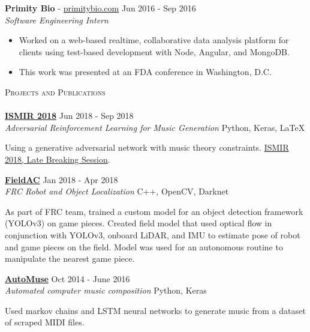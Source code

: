 \documentclass[a4paper]{article}
\newcommand{\lineunder} {
	\vspace*{-8pt} \\
	\hspace*{-18pt} \hrulefill \\
}
\newcommand{\header} [1] {
	{\hspace*{-18pt}\vspace*{6pt} \textsc{#1}}
	\vspace*{-6pt} \lineunder
}
\begin{document}
\noindent
\textbf{Primity Bio} - \url{primitybio.com} \hfill Jun 2016 - Sep 2016\\
\textit{Software Engineering Intern} \\
\vspace{-6mm}
\begin{itemize} \itemsep 0.1pt
	\item Worked on a web-based realtime, collaborative data analysis platform for clients using test-based development with Node, Angular, and MongoDB.
	\item This work was presented at an FDA conference in Washington, D.C.
\end{itemize}



\header{Projects and Publications}
\noindent
\href{http://ismir2018.ircam.fr/pages/events-lbd.html}{\textbf{ISMIR 2018}} \hfill Jun 2018 - Sep 2018\\
\textit{Adversarial Reinforcement Learning for Music Generation} \hfill Python, Keras, \LaTeX\\
\vspace{-25pt}
\begin{paragraph}{}
\begin{sloppypar}
Using a generative adversarial network with music theory constraints. \href{http://ismir2018.ircam.fr/pages/events-lbd.html}{ISMIR 2018, Late Breaking Session}.\\
\end{sloppypar}
\end{paragraph}

\noindent
\href{https://github.com/RoboticsTeam4904/FieldAC}{\textbf{FieldAC}} \hfill Jan 2018 - Apr 2018\\
\textit{FRC Robot and Object Localization} \hfill C++, OpenCV, Darknet\\
\vspace{-25pt}
\begin{paragraph}{}
As part of FRC team, trained a custom model for an object detection framework (YOLOv3) on game pieces. Created field model that used optical flow in conjunction with YOLOv3, onboard LiDAR, and IMU to estimate pose of robot and game pieces on the field. Model was used for an autonomous routine to manipulate the nearest game piece.\\

\end{paragraph}
\noindent
\href{https://github.com/nacgarg/AutoMuse}{\textbf{AutoMuse}} \hfill Oct 2014 - June 2016\\
\textit{Automated computer music composition} \hfill Python, Keras
\vspace{-13pt}
\begin{paragraph}{}
Used markov chains and LSTM neural networks to generate music from a dataset of scraped MIDI files. \\ 

\end{paragraph}
\end{document}
